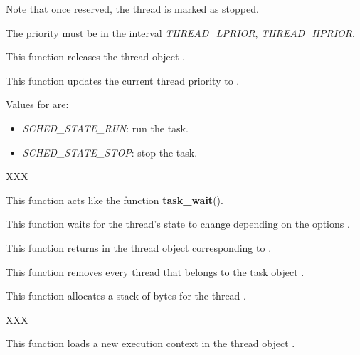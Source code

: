 \begin{itemize}
{	   Note that once reserved, the thread is marked as stopped.

	   The priority must be in the interval \emph{THREAD\_LPRIOR},
	   \emph{THREAD\_HPRIOR}.
	 }

	 {
	   This function releases the thread object .
	 }

	 {
	   This function updates the current thread priority
	   to .

	   Values for  are:

	   \begin{itemize}
	     \item
	       \emph{SCHED\_STATE\_RUN}: run the task.
	     \item
	       \emph{SCHED\_STATE\_STOP}: stop the task.
	   \end{itemize}
	 }

	 {
	   XXX
	 }

	 {
	   This function acts like the function \textbf{task\_wait}().

	   This function waits for the thread's state to change depending on
	   the options .

	 }

	 {
	   This function returns in  the thread object
	   corresponding to .
	 }

	 {
	   This function removes every thread that belongs to the
	   task object .
	 }

	 {
	   This function allocates a stack of  bytes
	   for the thread .

	   XXX
	 }

	 {
	   This function loads a new execution context in the thread
	   object .

}
\end{itemize}
